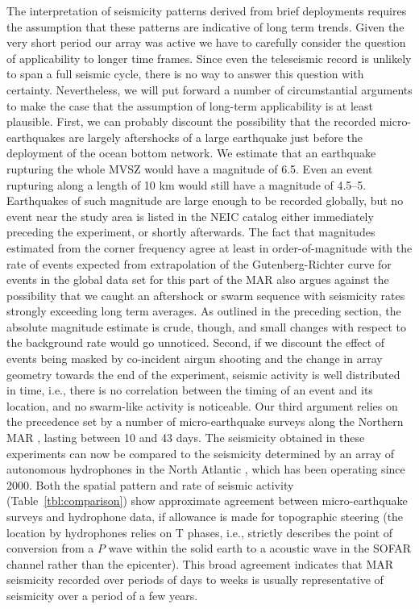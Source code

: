 \documentclass[jgr]{agu2001}
\newlength{\tw}
\begin{document}
\begin{article}
The interpretation of  seismicity patterns derived from brief deployments requires
the  assumption that these patterns are indicative
of long term trends.
Given the very short period our array was
active we have to carefully consider the question of applicability to longer
time frames.  Since even the teleseismic record is unlikely to
span a full seismic cycle, there is no way to answer this question with
 certainty.  Nevertheless, we will put forward a number of
circumstantial arguments to make the case that the assumption of long-term
applicability is at least plausible.   First, we can probably discount the
possibility that the recorded micro-earthquakes are largely
aftershocks of a large earthquake just before the deployment of the
ocean bottom network.  We estimate that an earthquake rupturing the whole
MVSZ would have a magnitude of
6.5.  Even an event rupturing along a length of 10 km would still have
a magnitude of 4.5--5.  Earthquakes of such magnitude are large enough
to be recorded globally, but no event near the study area is listed in
the NEIC catalog \citep{neic}
either immediately preceding the experiment, or shortly afterwards.
The fact that magnitudes estimated from the corner frequency agree at
least in order-of-magnitude with the rate of events expected from
extrapolation of the Gutenberg-Richter curve for events in the global
data set for this part of the MAR also argues against the possibility that
we caught an aftershock or swarm sequence with
seismicity rates strongly exceeding long term averages.  As outlined
in the preceding section, the
absolute magnitude estimate is crude, though,  and  small changes with respect to the
background rate would go unnoticed.
Second, if we discount the effect of events being masked by
co-incident airgun shooting and the change in array geometry towards
the end of the experiment, seismic activity is well distributed in
time, i.e., there is no correlation between the timing of an event and
its location, and no swarm-like activity is noticeable. 
Our third argument relies on the precedence set by a number of
micro-earthquake surveys along the Northern MAR
\citep{toomey88,kong92,wolfe95,barclay01}, lasting between 10 and 43
days. The seismicity obtained in these experiments can now be compared
to the seismicity determined by an array of autonomous hydrophones
in the North Atlantic \citep{smith03}, which has been operating 
since 2000. Both the spatial pattern
\citep[Figure~13 of ][]{smith03} and rate of seismic
activity (Table~\ref{tbl:comparison}) show approximate agreement between
micro-earthquake surveys and hydrophone data, if allowance is made
for topographic steering  (the
location by hydrophones relies on T phases, i.e., strictly describes the
point of conversion from a $P$ wave within the solid earth to a
acoustic wave in the SOFAR channel rather than the epicenter).  This broad agreement indicates that
MAR seismicity recorded over periods of days to weeks is
usually representative of seismicity over a period of a few years.



\end{article}
\end{document}
